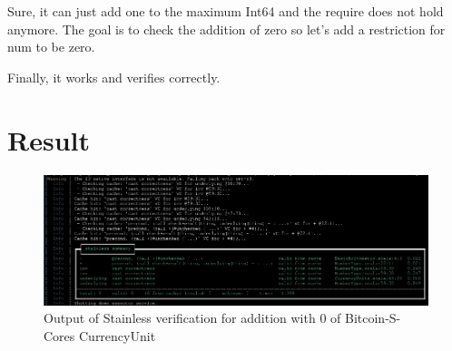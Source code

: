 Sure, it can just add one to the maximum Int64 and the require does not hold anymore.
The goal is to check the addition of zero so let's add a restriction for num to be zero.

Finally, it works and verifies correctly.

\section{Result}
\begin{figure}[H]
	\centering
		\includegraphics[scale=0.45]{images/final_verify_output.png}
	\caption{Output of Stainless verification for addition with 0 of Bitcoin-S-Cores CurrencyUnit}
	\label{fig:output1}
\end{figure}
